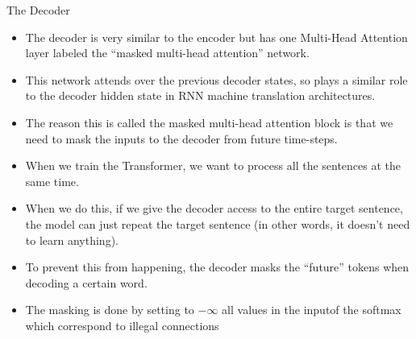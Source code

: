 \documentclass[handout]{beamer}
\begin{document}
\begin{frame}{The Decoder}
\begin{scriptsize}
\begin{itemize}

 \item  The decoder is very similar to the encoder but has one Multi-Head Attention layer labeled the ``masked multi-head attention'' network.
 
 \item This network attends over the previous decoder states, so plays a similar role to the decoder hidden state in RNN machine translation architectures. 
 
 \item The reason this is called the masked multi-head attention block is that we need to mask the inputs to the decoder from future time-steps.
 
 \item When we train the Transformer, we want to process all the sentences at the same time. 
 
 \item When we do this, if we give the decoder access to the entire target sentence, the model can just repeat the target sentence (in other words, it doesn't need to learn anything).
 
 \item To prevent this from happening, the decoder masks the ``future'' tokens when decoding a certain word.

  \item The masking is done by setting to $- \infty$ all values in the inputof the softmax which correspond to illegal connections
 
\end{itemize}

\end{scriptsize}

\end{frame}
\end{document}
